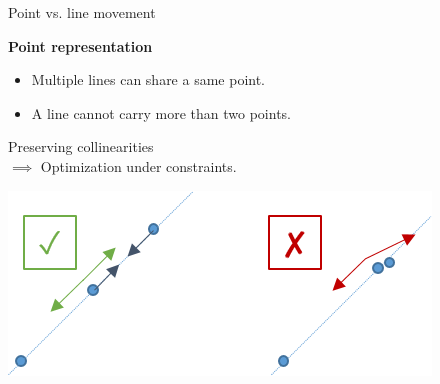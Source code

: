 \begin{frame}[c]{Point vs. line movement}
	\small
	
	\begin{minipage}{0.6\linewidth}
		\textbf{Point representation}
		\begin{itemize}
			\item[\cmark] Multiple lines can share a same point.
			\item[\xmark] A line cannot carry more than two points.
		\end{itemize}
		
		Preserving collinearities \\
		\hspace{0.05cm} $\implies$ Optimization under constraints.
		
		\vspace{0.5cm}
		
	\end{minipage}%
	\begin{minipage}{0.4\linewidth}
		\includegraphics[width=\linewidth]{point_mouvement}
	\end{minipage}	
\end{frame}

